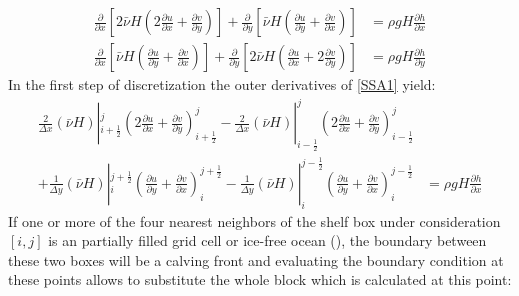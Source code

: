 \documentclass[a4paper,10pt]{article}
\begin{document}
\begin{align}
\frac{\partial}{\partial x}\left[ 2\bar\nu H\left( 2\frac{\partial u}{\partial x} + \frac{\partial v}{\partial y} \right)\right] + \frac{\partial }{\partial y}\left[\bar\nu H\left(\frac{\partial u}{\partial y}+\frac{\partial v}{\partial x}  \right) \right] &= \rho gH \frac{\partial h}{\partial x} \label{SSA1} \\
\frac{\partial}{\partial x}\left[ \bar\nu H\left( \frac{\partial u}{\partial y} + \frac{\partial v}{\partial x} \right)\right] + \frac{\partial }{\partial y}\left[2\bar\nu H\left(\frac{\partial u}{\partial x}+2\frac{\partial v}{\partial y}  \right) \right] &= \rho gH \frac{\partial h}{\partial y} \label{SSA2}
\end{align}
\noindent In the first step of discretization the outer derivatives of \eqref{SSA1} yield:
\begin{align}
\frac{2}{\Delta x}(\bar{\nu} H)|_{i+\frac{1}{2}}^j\left( 2\frac{\partial u}{\partial x} + \frac{\partial v}{\partial y} \right)_{i+\frac{1}{2}}^j
- \frac{2}{\Delta x}(\bar{\nu} H)|_{i-\frac{1}{2}}^j\left( 2\frac{\partial u}{\partial x} + \frac{\partial v}{\partial y} \right)_{i-\frac{1}{2}}^j \nonumber \\
+ \frac{1}{\Delta y}(\bar{\nu} H)|_i^{j+\frac{1}{2}}\left(\frac{\partial u}{\partial y}+\frac{\partial v}{\partial x}\right)_i^{j+\frac{1}{2}}
- \frac{1}{\Delta y}(\bar{\nu} H)|_i^{j-\frac{1}{2}}\left(\frac{\partial u}{\partial y}+\frac{\partial v}{\partial x}\right)_i^{j-\frac{1}{2}}
&= \rho gH \frac{\partial h}{\partial x} \label{SSA1_dis1}
\end{align}
If one or more of the four nearest neighbors of the shelf box under consideration $[i,j]$ is an partially filled grid cell or ice-free ocean (\cite{Albrecht_Martin10}), the boundary between these two boxes will be a calving front and evaluating the boundary condition at these points allows to substitute the whole block which is calculated at this point:
\end{document}
